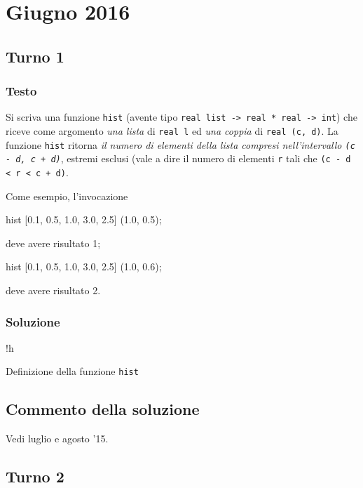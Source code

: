 \section{Giugno 2016}

\subsection{Turno 1}

\subsubsection{Testo}

Si scriva una funzione \texttt{hist} (avente tipo \texttt{real list -> real * real -> int}) che riceve come argomento \emph{una lista} di \texttt{real l} ed \emph{una coppia} di \texttt{real (c, d)}.
La funzione \texttt{hist} ritorna \emph{il numero di elementi della lista compresi nell'intervallo \texttt{(c - d, c + d)}}, estremi esclusi (vale a dire il numero di elementi \texttt{r} tali che \texttt{(c - d < r < c + d)}.

\medskip
Come esempio, l'invocazione

\begin{smlcode}
hist [0.1, 0.5, 1.0, 3.0, 2.5] (1.0, 0.5);
\end{smlcode}

deve avere risultato 1;

\begin{smlcode}
hist [0.1, 0.5, 1.0, 3.0, 2.5] (1.0, 0.6);
\end{smlcode}

deve avere risultato 2.

\subsubsection{Soluzione}

\begin{listing}{!h}
\caption[]{Definizione della funzione \texttt{hist}}
\end{listing}

\subsection{Commento della soluzione}

Vedi luglio e agosto '15.

\subsection{Turno 2}

